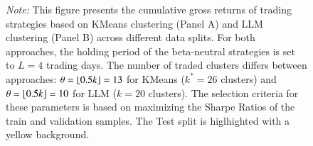 \begin{figure}[H]
\vspace{0.5cm}
\begin{minipage}{\textwidth}
\setlength{\parindent}{0pt}
{\footnotesize\textit{Note:} 
This figure presents the cumulative gross returns of trading strategies based on KMeans clustering (Panel A) and LLM clustering (Panel B) across different data splits. For both approaches, the holding period of the beta-neutral strategies is set to $L=4$ trading days. The number of traded clusters differs between approaches: $\theta=\lfloor 0.5k \rfloor=13$ for KMeans ($k^*=26$ clusters) and $\theta=\lfloor 0.5k \rfloor=10$ for LLM ($k=20$ clusters). The selection criteria for these parameters is based on maximizing the Sharpe Ratios of the train and validation samples. The Test split is higlhighted with a yellow background.
%
}
\end{minipage}
\end{figure}


